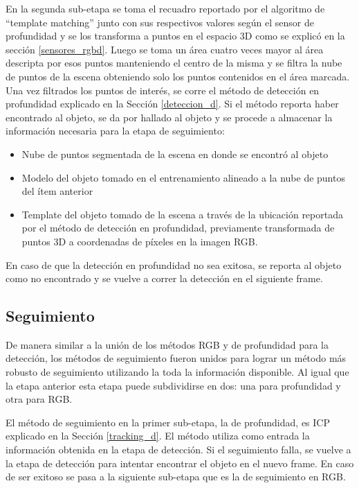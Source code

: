 En la segunda sub-etapa se toma el recuadro reportado por el algoritmo de ``template matching'' junto con sus respectivos valores según el sensor de profundidad y se los transforma a puntos en el espacio 3D como se explicó en la sección \ref{sensores_rgbd}. Luego se toma un área cuatro veces mayor al área descripta por esos puntos manteniendo el centro de la misma y se filtra la nube de puntos de la escena obteniendo solo los puntos contenidos en el área marcada. Una vez filtrados los puntos de interés, se corre el método de detección en profundidad explicado en la Sección \ref{deteccion_d}. Si el método reporta haber encontrado al objeto, se da por hallado al objeto y se procede a almacenar la información necesaria para la etapa de seguimiento:
\begin{itemize}
	\item Nube de puntos segmentada de la escena en donde se encontró al objeto
	\item Modelo del objeto tomado en el entrenamiento alineado a la nube de puntos del ítem anterior
	\item Template del objeto tomado de la escena a través de la ubicación reportada por el método de detección en profundidad, previamente transformada de puntos 3D a coordenadas de píxeles en la imagen RGB.
\end{itemize}

En caso de que la detección en profundidad no sea exitosa, se reporta al objeto como no encontrado y se vuelve a correr la detección en el siguiente frame.


\subsection{Seguimiento}\label{tracking_rgbd}
De manera similar a la unión de los métodos RGB y de profundidad para la detección, los métodos de seguimiento fueron unidos para lograr un método más robusto de seguimiento utilizando la toda la información disponible. Al igual que la etapa anterior esta etapa puede subdividirse en dos: una para profundidad y otra para RGB.

El método de seguimiento en la primer sub-etapa, la de profundidad, es ICP explicado en la Sección \ref{tracking_d}. El método utiliza como entrada la información obtenida en la etapa de detección. Si el seguimiento falla, se vuelve a la etapa de detección para intentar encontrar el objeto en el nuevo frame. En caso de ser exitoso se pasa a la siguiente sub-etapa que es la de seguimiento en RGB.

